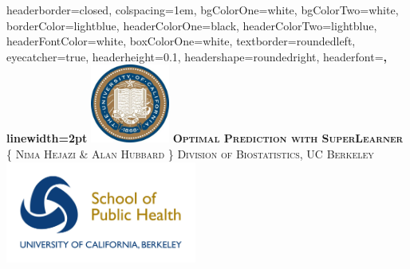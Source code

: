 \documentclass[landscape,a0paper,fontscale=0.285]{baposter} %
\begin{document}
\begin{poster}
{
headerborder=closed, %
colspacing=1em, %
bgColorOne=white, %
bgColorTwo=white, %
borderColor=lightblue, %
headerColorOne=black, %
headerColorTwo=lightblue, %
headerFontColor=white, %
boxColorOne=white, %
textborder=roundedleft, %
eyecatcher=true, %
headerheight=0.1\textheight, %
headershape=roundedright, %
headerfont=\Large\bf\textsc, %
linewidth=2pt %
}
%
{\includegraphics[height=7em]{logo_cal.jpg}} %
{\bf\textsc{Optimal Prediction with SuperLearner}\vspace{0.5em}} %
{\textsc{\{ Nima Hejazi \& Alan Hubbard \} \hspace{12pt} Division of Biostatistics, UC Berkeley}}
{\includegraphics[height=9em]{logo_sph.jpg}} %


\end{poster}
\end{document}
